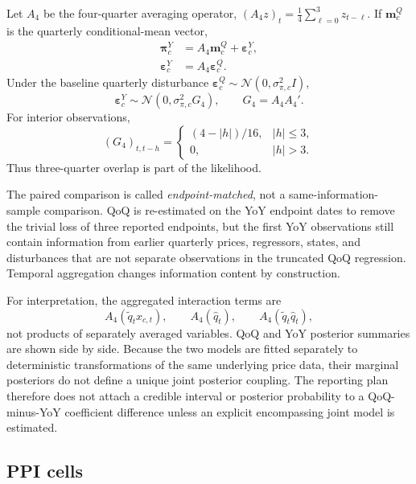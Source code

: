 \documentclass[11pt]{article}
\newcommand{\Normal}{\mathcal{N}}
\begin{document}
Let $A_4$ be the four-quarter averaging operator, $(A_4z)_t=\frac14\sum_{\ell=0}^3z_{t-\ell}$. If $\bm m_c^Q$ is the quarterly conditional-mean vector,
\begin{align}
\bm\pi_c^Y &= A_4\bm m_c^Q+\bm\varepsilon_c^Y,\\
\bm\varepsilon_c^Y &= A_4\bm\varepsilon_c^Q.
\label{eq:yoy_aggregation}
\end{align}
Under the baseline quarterly disturbance $\bm\varepsilon_c^Q\sim\Normal(0,\sigma_{\pi,c}^2I)$,
\begin{equation}
\bm\varepsilon_c^Y\sim\Normal(0,\sigma_{\pi,c}^2G_4),
\qquad G_4=A_4A_4'.
\label{eq:yoy_covariance}
\end{equation}
For interior observations,
\begin{equation}
(G_4)_{t,t-h}
=
\begin{cases}
(4-|h|)/16,& |h|\le3,\\
0,& |h|>3.
\end{cases}
\end{equation}
Thus three-quarter overlap is part of the likelihood.

The paired comparison is called \emph{endpoint-matched}, not a same-information-sample comparison. QoQ is re-estimated on the YoY endpoint dates to remove the trivial loss of three reported endpoints, but the first YoY observations still contain information from earlier quarterly prices, regressors, states, and disturbances that are not separate observations in the truncated QoQ regression. Temporal aggregation changes information content by construction.

For interpretation, the aggregated interaction terms are
\begin{equation}
A_4(\tilde q_tx_{c,t}),
\qquad A_4(\hat q_t),
\qquad A_4(\tilde q_t\hat q_t),
\end{equation}
not products of separately averaged variables. QoQ and YoY posterior summaries are shown side by side. Because the two models are fitted separately to deterministic transformations of the same underlying price data, their marginal posteriors do not define a unique joint posterior coupling. The reporting plan therefore does not attach a credible interval or posterior probability to a QoQ-minus-YoY coefficient difference unless an explicit encompassing joint model is estimated.

\subsection{PPI cells}
\end{document}
